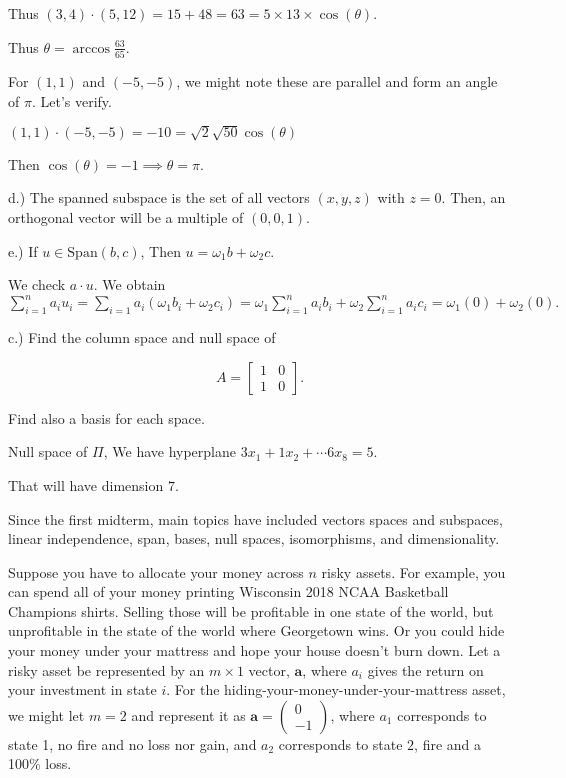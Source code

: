 \documentclass{article}
\begin{document}
Thus $(3,4)\cdot(5,12) =15+48=63= 5\times 13 \times \cos (\theta) $.

Thus $\theta = \arccos \frac{63}{65}$.


For $(1,1)$ and $(-5,-5)$, we might note these are parallel and form an angle of $\pi$. Let's verify. 


$(1,1)\cdot (-5,-5) = -10 = \sqrt{2}\sqrt{50}\cos (\theta)$

Then $\cos(\theta) = -1 \implies \theta = \pi$. 

d.) The spanned subspace is the set of all vectors $(x,y,z)$ with $z=0$. Then, an orthogonal vector will be a multiple of $(0,0,1)$. 

e.) If $u\in \text{Span}(b,c)$, Then $u = \omega_1 b + \omega_2 c$. 

We check $a \cdot u$. We obtain $\sum_{i=1}^n a_i u_i = \sum_{i=1} a_i(\omega_1 b_i + \omega_2 c_i) = \omega_1\sum_{i=1}^n a_i b_i + \omega_2 \sum_{i=1}^n a_i c_i = \omega_1(0) + \omega_2(0).$ 

\pagebreak

c.) Find the column space and null space of 

$$ A= \left[ \begin{array}{cc}
1 & 0 \\
1 & 0
\end{array}\right].$$

Find also a basis for each space. 



Null space of $\Pi$, We have hyperplane $3x_1 + 1x_2 + \cdots 6x_8 = 5$.

That will have dimension $7$. 

\pagebreak


\pagebreak

Since the first midterm, main topics have included vectors spaces and subspaces, linear independence, span, bases, null spaces, isomorphisms, and  dimensionality. 


Suppose you have to allocate your money across $n$ risky assets. For example, you can spend all of your money printing Wisconsin 2018 NCAA Basketball Champions shirts. Selling those will be profitable in one state of the world, but unprofitable in the state of the world where Georgetown wins. Or you could hide your money under your mattress and hope your house doesn't burn down. Let a risky asset be represented by an $m\times 1$ vector, $\mathbf{a}$, where $a_i$ gives the return on your investment in state $i$. For the hiding-your-money-under-your-mattress asset, we might let $m=2$ and represent it as $\mathbf{a}=\left(\begin{array}{c} 
0\\
-1  \end{array}\right)$, where $a_1$ corresponds to state 1, no fire and no loss nor gain, and $a_2$ corresponds to state $2$, fire and a 100\% loss.
\end{document}
